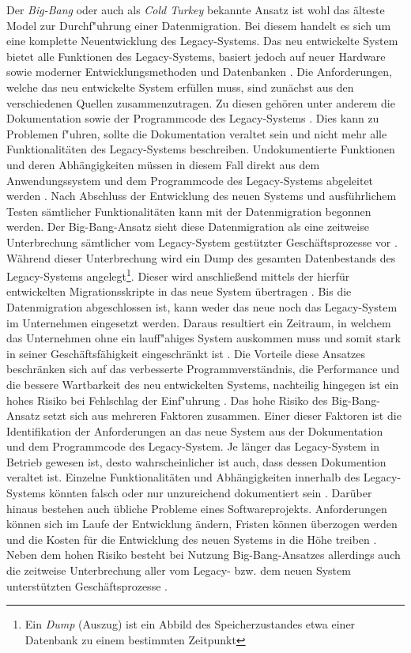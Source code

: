Der \textit{Big-Bang} oder auch als \textit{Cold Turkey} bekannte Ansatz ist wohl das älteste Model zur Durchf"uhrung einer Datenmigration. Bei diesem handelt es sich um eine komplette Neuentwicklung des Legacy-Systems. Das neu entwickelte System bietet alle Funktionen des Legacy-Systems, basiert jedoch auf neuer Hardware sowie moderner Entwicklungsmethoden und Datenbanken \citep[S.~105]{bisbal-1999}.
\lb
Die Anforderungen, welche das neu entwickelte System erfüllen muss, sind zunächst aus den verschiedenen Quellen zusammenzutragen. Zu diesen gehören unter anderem die Dokumentation sowie der Programmcode des Legacy-Systems \citep[S.~2]{brodie-1993}. Dies kann zu Problemen f"uhren, sollte die Dokumentation veraltet sein und nicht mehr alle Funktionalitäten des Legacy-Systems beschreiben. Undokumentierte Funktionen und deren Abhängigkeiten müssen in diesem Fall direkt aus dem Anwendungssystem und dem Programmcode des Legacy-Systems abgeleitet werden \citep[S.~2]{brodie-1993} .
\lb
Nach Abschluss der Entwicklung des neuen Systems und ausführlichem Testen sämtlicher Funktionalitäten kann mit der Datenmigration begonnen werden. Der Big-Bang-Ansatz sieht diese Datenmigration als eine zeitweise Unterbrechung sämtlicher vom Legacy-System gestützter Geschäftsprozesse vor \citep[S.~4]{wuLawless-1997}. Während dieser Unterbrechung wird ein Dump des gesamten Datenbestands des Legacy-Systems angelegt\footnote{Ein \textit{Dump} (Auszug) ist ein Abbild des Speicherzustandes etwa einer Datenbank zu einem bestimmten Zeitpunkt}. Dieser wird anschließend mittels der hierfür entwickelten Migrationsskripte in das neue System übertragen \citep[S.~3]{brodie-1993}. Bis die Datenmigration abgeschlossen ist, kann weder das neue noch das Legacy-System im Unternehmen eingesetzt werden. Daraus resultiert ein Zeitraum, in welchem das Unternehmen ohne ein lauff"ahiges System auskommen muss und somit stark in seiner Geschäftsfähigkeit eingeschränkt ist \citep[S.~3f.]{brodie-1993}.
\newpage
Die Vorteile diese Ansatzes beschränken sich auf das verbesserte Programmverständnis, die Performance und die bessere Wartbarkeit des neu entwickelten Systems, nachteilig hingegen ist ein hohes Risiko bei Fehlschlag der Einf"uhrung \citep[S.~105]{bisbal-1999}. Das hohe Risiko des Big-Bang-Ansatz setzt sich aus mehreren Faktoren zusammen. Einer dieser Faktoren ist die Identifikation der Anforderungen an das neue System aus der Dokumentation und dem Programmcode des Legacy-System. Je länger das Legacy-System in Betrieb gewesen ist, desto wahrscheinlicher ist auch, dass dessen Dokumention veraltet ist. Einzelne Funktionalitäten und Abhängigkeiten innerhalb des Legacy-Systems könnten falsch oder nur unzureichend dokumentiert sein \citep[S.~2]{brodie-1993}. Darüber hinaus bestehen auch übliche Probleme eines Softwareprojekts. Anforderungen können sich im Laufe der Entwicklung ändern, Fristen können überzogen werden und die Kosten für die Entwicklung des neuen Systems in die Höhe treiben \citep[S.~2f.]{brodie-1993}. Neben dem hohen Risiko besteht bei Nutzung Big-Bang-Ansatzes allerdings auch die zeitweise Unterbrechung aller vom Legacy- bzw. dem neuen System unterstützten Geschäftsprozesse \citep[S.~4]{wuLawless-1997}.
